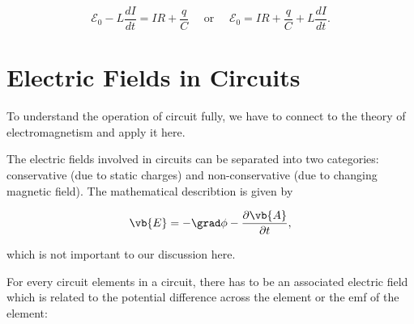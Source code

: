 \documentclass[english,a4paper,12pt]{report}
\begin{document}
\begin{equation}
    \mathcal{E}_{0} - L\frac{dI}{dt} = IR + \frac{q}{C} \text {  ~~ or  ~~ } \mathcal{E}_{0} = IR + \frac{q}{C} + L\frac{dI}{dt} .  
\end{equation}

\section{Electric Fields in Circuits}

To understand the operation of circuit fully, we have to connect to the theory of electromagnetism and apply it here. 

The electric fields involved in circuits can be separated into two categories: conservative (due to static charges) and non-conservative (due to changing magnetic field). The mathematical describtion is given by 

\begin{equation}
    \vb{E}  = -\grad \phi - \frac{\partial \vb{A} }{\partial t}, 
\end{equation}

which is not important to our discussion here. 

For every circuit elements in a circuit, there has to be an associated electric field which is related to the potential difference across the element or the emf of the element:
\end{document}
